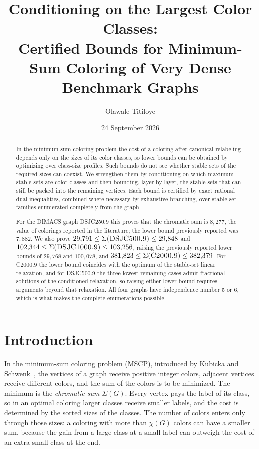 \documentclass[11pt]{article}
\title{Conditioning on the Largest Color Classes:\\
Certified Bounds for Minimum-Sum Coloring of Very Dense Benchmark Graphs}
\author{Olawale Titiloye}
\date{24 September 2026}
\theoremstyle{definition}
\newcommand{\DSJCTwoFifty}{\textnormal{\textsc{DSJC250.9}}}
\newcommand{\DSJCFiveHundred}{\textnormal{\textsc{DSJC500.9}}}
\newcommand{\DSJCThousand}{\textnormal{\textsc{DSJC1000.9}}}
\newcommand{\CTwoThousand}{\textnormal{\textsc{C2000.9}}}
\begin{document}
\maketitle

\begin{abstract}
In the minimum-sum coloring problem the cost of a coloring after canonical
relabeling depends only on the sizes of its color classes, so lower bounds
can be obtained by optimizing over class-size profiles. Such bounds do not
see whether stable sets of the
required sizes can coexist. We strengthen them by conditioning on which
maximum stable sets are color classes and then bounding, layer by layer, the
stable sets that can still be packed into the remaining vertices. Each bound
is certified by exact rational dual inequalities, combined where necessary by
exhaustive branching, over stable-set families enumerated completely from the
graph.

For the DIMACS graph \DSJCTwoFifty{} this proves that the chromatic sum is
$8{,}277$, the value of colorings reported in the literature; the lower bound
previously reported was $7{,}882$. We also prove
$29{,}791\le\Sigma(\DSJCFiveHundred)\le29{,}848$ and
$102{,}344\le\Sigma(\DSJCThousand)\le103{,}256$, raising the previously
reported lower bounds of $29{,}768$ and $100{,}078$, and
$381{,}823\le\Sigma(\CTwoThousand)\le382{,}379$. For \CTwoThousand{} the lower
bound coincides with the optimum of the stable-set linear relaxation, and for
\DSJCFiveHundred{} the three lowest remaining cases admit fractional
solutions of the conditioned relaxation, so raising either lower bound requires
arguments beyond that relaxation. All four graphs have independence number 5
or 6, which is what makes the complete enumerations possible.
\end{abstract}

\section{Introduction}
\label{sec:introduction}

In the minimum-sum coloring problem (MSCP), introduced by Kubicka and
Schwenk~\cite{kubicka1989}, the vertices of a graph receive positive integer
colors, adjacent vertices receive different colors, and the sum of the colors
is to be minimized. The minimum is the \emph{chromatic sum} $\Sigma(G)$.
Every vertex pays the label of its class, so in an optimal coloring larger
classes receive smaller labels, and the cost is determined by the sorted
sizes of the classes. The number of colors enters only through those sizes:
a coloring with more than $\chi(G)$ colors can have a smaller sum, because
the gain from a large class at a small label can outweigh the cost of an
extra small class at the end.
\end{document}
